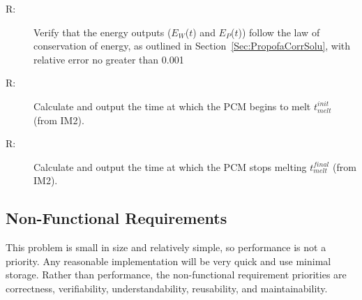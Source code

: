 \documentclass[12pt]{article}
\newcounter{reqnum}
\newcommand{\rthereqnum}{R\thereqnum}
\begin{document}
\begin{description}
\item[\rthereqnum\label{Rreq9}:]Verify that the energy outputs ($E_{W}$($t$) and $E_{P}$($t$)) follow the law of conservation of energy, as outlined in Section~\ref{Sec:PropofaCorrSolu}, with relative error no greater than 0.001%
\end{description}
\begin{description}
\item[\rthereqnum\label{Rreq10}:]Calculate and output the time at which the PCM begins to melt $t_{melt}^{init}$ (from IM2).
\end{description}
\begin{description}
\item[\rthereqnum\label{Rreq11}:]Calculate and output the time at which the PCM stops melting $t_{melt}^{final}$ (from IM2).
\end{description}
\subsection{Non-Functional Requirements}
\label{Sec:Non-Requ}
This problem is small in size and relatively simple, so performance is not a priority. Any reasonable implementation will be very quick and use minimal storage. Rather than performance, the non-functional requirement priorities are correctness, verifiability, understandability, reusability, and maintainability.
\end{document}
